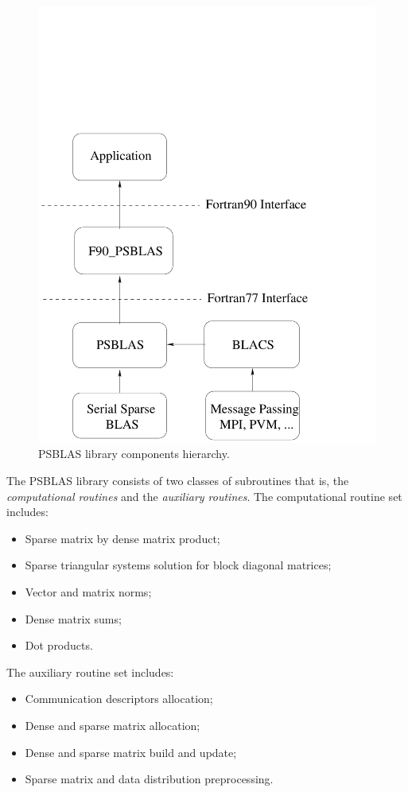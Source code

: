 \begin{figure}[h] \begin{center}
\includegraphics[scale=0.45]{figures/psblas}
\end{center}
\caption{PSBLAS library components hierarchy.\label{fig:psblas}}
\end{figure}

The PSBLAS library consists of two classes of subroutines that is, the
{\em computational routines} and the {\em auxiliary routines}.  The
computational routine set includes:

\begin{itemize}
\item Sparse matrix by dense matrix product; \item Sparse triangular
systems solution for block diagonal matrices;
\item Vector and matrix norms;
\item Dense matrix sums;
\item Dot products.
\end{itemize} 
The auxiliary routine set includes:
\begin{itemize}
\item Communication descriptors allocation;
\item Dense and sparse matrix allocation;
\item Dense and sparse matrix build and update;
\item Sparse matrix and data distribution preprocessing.
\end{itemize} 

